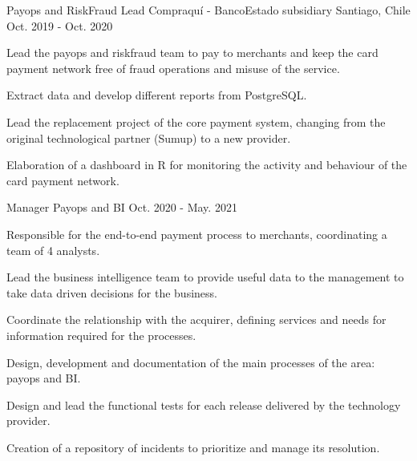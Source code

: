 

\begin{cventries}
  \cventrytwopositions
    {Payops and RiskFraud Lead}
    {Compraquí - BancoEstado subsidiary}
    {Santiago, Chile}
    {Oct. 2019 - Oct. 2020}
    {
      \begin{cvitems}
	      \item {Lead the payops and riskfraud team to pay to merchants and keep the card payment network free of fraud operations and misuse of the service.}
	      \item {Extract data and develop different reports from PostgreSQL.}
	      \item {Lead the replacement project of the core payment system, changing from the original technological partner (Sumup) to a new provider.}
	      \item {Elaboration of a dashboard in R for monitoring the activity and behaviour of the card payment network.}
      \end{cvitems}
    }
    {Manager Payops and BI}
    {Oct. 2020 - May. 2021}
    {
      \begin{cvitems}
        \item {Responsible for the end-to-end payment process to merchants,
 coordinating a team of 4 analysts.}
        \item {Lead the business intelligence team to provide useful data to
the management to take data driven decisions for the business.}
        \item {Coordinate the relationship with the acquirer, defining services
and needs for information required for the processes.}
	\item {Design, development and documentation of the main processes of the area: payops and BI.}
	\item {Design and lead the functional tests for each release delivered by the technology provider.}
	\item {Creation of a repository of incidents to prioritize and manage its resolution.}
      \end{cvitems}
    }
    

\end{cventries}
